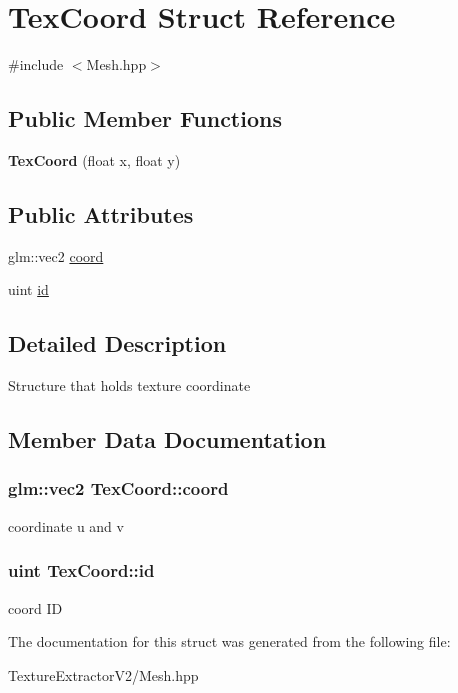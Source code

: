 \hypertarget{struct_tex_coord}{}\section{Tex\+Coord Struct Reference}
\label{struct_tex_coord}


{\ttfamily \#include $<$Mesh.\+hpp$>$}

\subsection*{Public Member Functions}
\begin{DoxyCompactItemize}
\item 
\hypertarget{struct_tex_coord_a02018ed90402d77cb313b581c0ea0561}{}{\bfseries Tex\+Coord} (float x, float y)\label{struct_tex_coord_a02018ed90402d77cb313b581c0ea0561}

\end{DoxyCompactItemize}
\subsection*{Public Attributes}
\begin{DoxyCompactItemize}
\item 
glm\+::vec2 \hyperlink{struct_tex_coord_a31698d41a1be7a51cbaed632c4fae1e7}{coord}
\item 
uint \hyperlink{struct_tex_coord_aef29d0ef3a3fdcefdda756a2820e2a23}{id}
\end{DoxyCompactItemize}


\subsection{Detailed Description}
Structure that holds texture coordinate 

\subsection{Member Data Documentation}
\hypertarget{struct_tex_coord_a31698d41a1be7a51cbaed632c4fae1e7}{}
\subsubsection[{coord}]{\setlength{\rightskip}{0pt plus 5cm}glm\+::vec2 Tex\+Coord\+::coord}\label{struct_tex_coord_a31698d41a1be7a51cbaed632c4fae1e7}
coordinate u and v \hypertarget{struct_tex_coord_aef29d0ef3a3fdcefdda756a2820e2a23}{}
\subsubsection[{id}]{\setlength{\rightskip}{0pt plus 5cm}uint Tex\+Coord\+::id}\label{struct_tex_coord_aef29d0ef3a3fdcefdda756a2820e2a23}
coord I\+D 

The documentation for this struct was generated from the following file\+:\begin{DoxyCompactItemize}
\item 
Texture\+Extractor\+V2/Mesh.\+hpp\end{DoxyCompactItemize}
